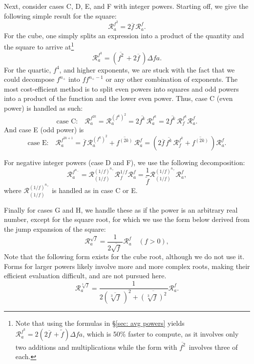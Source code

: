 \documentclass[10pt]{article}
\renewcommand{\j}[1]{\Delta #1}
\newcommand{\jr}[2]{\mathcal{R}^{#1}_{#2}}
\newcommand{\avg}[1]{\overline{#1}\,}
\newcommand{\invavg}[1]{\widetilde{#1}}
\begin{document}
Next, consider cases C, D, E, and F with integer powers.
Starting off, we give the following simple result for the square:
\begin{equation}
	\jr{f^2}{a} = 2\avg{f}\jr{f}{a}.
\end{equation}
For the cube, one simply splits an expression into a product of the quantity and the square to arrive at\footnote{Note that using the formulas in \S\ref{sec: avg powers} yields $\jr{f^3}{a} = 2\left(2\avg{f} + \invavg{f}\right)\j{f}{a}$, which is 50\% faster to compute, as it involves only two additions and multiplications while the form with $\avg{f^2}$ involves three of each.}
\begin{equation}
	\jr{f^3}{a} = \left(\avg{f^2} + 2\avg{f}\right)\j{f}{a}.
\end{equation}
For the quartic, $f^4$, and higher exponents, we are stuck with the fact that we could decompose $f^{n_+}$ into $ff^{n_+-1}$ or any other combination of exponents.
The most cost-efficient method is to split even powers into squares and odd powers into a product of the function and the lower even power.
Thus, case C (even power) is handled as such:
\begin{equation}
	\text{case C:} \quad \jr{f^{2k}}{a} = \jr{(f^k)^2}{a} = 2\avg{f^k}\jr{f^k}{a} = 2\avg{f^k}\jr{f^k}{f}\jr{f}{a}.
\end{equation}
And case E (odd power) is
\begin{equation}
	\text{case E:} \quad \jr{f^{2k+1}}{a} = \avg{f}\jr{(f^k)^2}{a} + \avg{f^{(2k)}}\jr{f}{a} = \left(2\avg{f}\avg{f^k}\jr{f^k}{f} + \avg{f^{(2k)}}\right)\jr{f}{a}.
\end{equation}

For negative integer powers (case D and F), we use the following decomposition:
\begin{equation}
	\jr{f^{n_-}}{a} = \jr{(1/f)^{n_+}}{(1/f)}\jr{1/f}{f}\jr{f}{a} = \frac{1}{\invavg{f}}\jr{(1/f)^{n_+}}{(1/f)}\jr{f}{a},
\end{equation}
where $\jr{(1/f)^{n_+}}{(1/f)}$ is handled as in case C or E.

Finally for cases G and H, we handle these as if the power is an arbitrary real number, except for the square root, for which we use the form below derived from the jump expansion of the square:
\begin{equation}
	\jr{\sqrt{f}}{a} = \frac{1}{2\avg{\sqrt{f}}}\jr{f}{a} \quad (f>0),
\end{equation}
Note that the following form exists for the cube root, although we do not use it.
Forms for larger powers likely involve more and more complex roots, making their efficient evaluation difficult, and are not pursued here.
\begin{equation}
	\jr{\sqrt[3]{f}}{a} = \frac{1}{2\left(\avg{\sqrt[3]{f}}\right)^2 + \avg{\left(\sqrt[3]{f}\right)^2}}\jr{f}{a}.
\end{equation}
\end{document}
